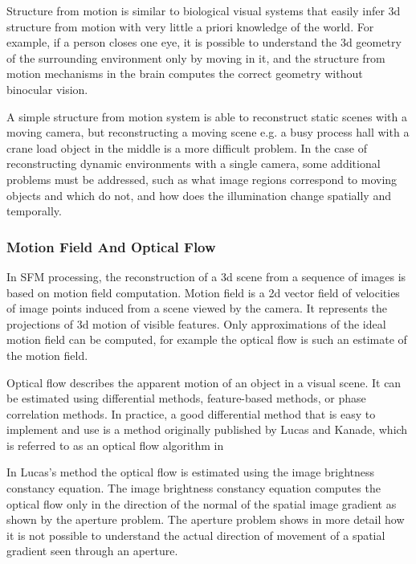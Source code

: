 \documentclass[12pt,a4paper,oneside,pdftex]{report}
\begin{document}
{Structure from motion is similar to biological visual systems that easily infer 3d structure from motion with very little a priori knowledge of the world. For example, if a person closes one eye, it is possible to understand the 3d geometry of the surrounding environment only by moving in it, and the structure from motion mechanisms in the brain computes the correct geometry without binocular vision.

A simple structure from motion system is able to reconstruct static scenes with a moving camera, but reconstructing a moving scene e.g. a busy process hall with a crane load object in the middle is a more difficult problem. In the case of reconstructing dynamic environments with a single camera, some additional problems must be addressed, such as what image regions correspond to moving objects and which do not, and how does the illumination change spatially and temporally.

\subsubsection{Motion Field And Optical Flow}
\label{subsubsection:motion_field_and_optical_flow}

In SFM processing, the reconstruction of a 3d scene from a sequence of images is based on motion field computation. Motion field is a 2d vector field of velocities of image points induced from a scene viewed by the camera. It represents the projections of 3d motion of visible features. Only approximations of the ideal motion field can be computed, for example the optical flow is such an estimate of the motion field.

Optical flow describes the apparent motion of an object in a visual scene. It can be estimated using differential methods, feature-based methods, or phase correlation methods. In practice, a good differential method that is easy to implement and use is a method originally published by Lucas and Kanade, which is referred to as an optical flow algorithm in \citep{Trucco98, Lucas81}

In Lucas's method the optical flow is estimated using the image brightness constancy equation. The image brightness constancy equation computes the optical flow only in the direction of the normal of the spatial image gradient as shown by the aperture problem. The aperture problem shows in more detail how it is not possible to understand the actual direction of movement of a spatial gradient seen through an aperture.  

}
\end{document}
